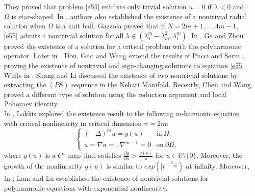 \documentclass[reqno]{amsart}
\newcommand{\la} {\lambda}
\newcommand{\Om}{\Omega}
\newcommand{\noi} {  \noindent}
\newcommand{\mb} {\mathbb}
\numberwithin{theorem}{section} \numberwithin{equation}{section}
\begin{document}
\noi They proved that problem \eqref{e55} exhibits only trivial solution $u=0$ if $\la<0$ and
$\Om$ is star-shaped. In \cite{32pucci1990critical}, authors also established the existence of a nontrivial radial solution when $\Om$ is a unit ball. Gazzola \cite{33gazzola1998critical} proved that if $N=2m+1,\ldots,4m-1$,
\eqref{e55} admits a nontrivial solution for all
$\la \in (\la_1^{m} - \la_m^2, \la_1^{m})$. In \cite{39ge2011critical}, Ge and Zhou proved the existence of a solution for a critical problem with the polyharmonic operator. Later in \cite{40dou2012solutions}, Dou, Guo and Wang  extend the results of Pucci and Serin \cite{36pucci1986general}, proving the existence of nontrivial and sign-changing solutions to equation \eqref{e55}.  While in \cite{22shang2014multiple}, Shang and Li discussed the existence of two nontrivial solutions by extracting the $(PS)$ sequence in the Nehari Manifold. Recently, Chen and Wang \cite{38chen2025new} proved a different type of solution using the reduction argument and local Pohozaev identity.\\
In \cite{1310.57262/ade/1366030750}, Lakkis explored the existence result to the following $m$-harmonic equation with critical nonlinearity in critical dimension $n=2m$: %
\begin{equation*} %
\begin{cases}
(-\Delta)^{m} u=g(u) & \text {in}\ \Om,\\
u=\nabla u=..\nabla^{m-1}=0 & \text {on}\ \partial\Om, 
\end{cases}
\end{equation*}
where $g(u)$ is a $C^1$ map that satisfies $\frac{\partial g}{\partial u}> \frac{g(u)}{u}$ for $u \in \mb{R}\setminus\{0\}$. Moreover, the growth of the nonlinearity $g(u)$ is similar to $exp(|t|^{\frac{n}{n-m}})$ at infinity. Moreover, In \cite{14article}, Lam and Lu established the existence of nontrivial solutions for polyharmonic equations with exponential nonlinearity.\\
\end{document}

